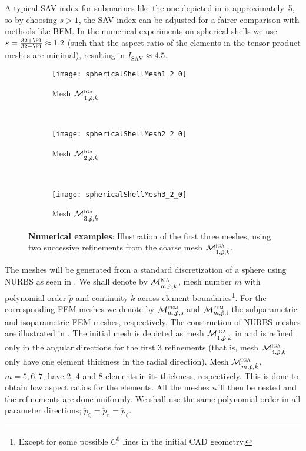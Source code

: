A typical SAV index for submarines like the one depicted in  is approximately~5, so by choosing $s>1$, the SAV index can be adjusted for a fairer comparison with methods like BEM. In the numerical experiments on spherical shells we use $s=\frac{32+\PI}{32-\PI}\approx 1.2$ (such that the aspect ratio of the elements in the tensor product meshes are minimal), resulting in $I_{\mathrm{SAV}}\approx 4.5$.
\begin{figure}
	\centering
	\begin{subfigure}{0.3\textwidth}
		\centering
		\texttt{[image: sphericalShellMesh1\_2\_0]}
		\caption{Mesh ${\cal M}_{1,\check{p},\check{k}}^{\textsc{iga}}$}
		\label{Fig2:SphericalShellMeshes1}
    \end{subfigure}
    ~
	\begin{subfigure}{0.3\textwidth}
		\centering
		\texttt{[image: sphericalShellMesh2\_2\_0]}
		\caption{Mesh ${\cal M}_{2,\check{p},\check{k}}^{\textsc{iga}}$}
		\label{Fig2:SphericalShellMeshes2}
    \end{subfigure}
    ~
	\begin{subfigure}{0.3\textwidth}
		\centering
		\texttt{[image: sphericalShellMesh3\_2\_0]}
		\caption{Mesh ${\cal M}_{3,\check{p},\check{k}}^{\textsc{iga}}$}
		\label{Fig2:SphericalShellMeshes3}
    \end{subfigure}
	\caption{\textbf{Numerical examples}: Illustration of the first three meshes, using two successive refinements from the coarse mesh ${\cal M}_{1,\check{p},\check{k}}^{\textsc{iga}}$.}
	\label{Fig2:SphericalShellMeshes}
\end{figure}

The meshes will be generated from a standard discretization of a sphere using NURBS as seen in . We shall denote by ${\cal M}_{m,\check{p},\check{k}}^{\textsc{iga}}$, mesh number $m$ with polynomial order $\check{p}$ and continuity $\check{k}$ across element boundaries\footnote{Except for some possible $C^0$ lines in the initial CAD geometry.}. For the corresponding FEM meshes we denote by ${\cal M}_{m,\check{p},\mathrm{s}}^{\textsc{fem}}$ and ${\cal M}_{m,\check{p},\mathrm{i}}^{\textsc{fem}}$ the subparametric and isoparametric FEM meshes, respectively. The construction of NURBS meshes are illustrated in . The initial mesh is depicted as mesh ${\cal M}_{1,\check{p},\check{k}}^{\textsc{iga}}$ in  and is refined only in the angular directions for the first 3 refinements (that is, mesh ${\cal M}_{4,\check{p},\check{k}}^{\textsc{iga}}$ only have one element thickness in the radial direction). Mesh ${\cal M}_{m,\check{p},\check{k}}^{\textsc{iga}}$, $m=5,6,7$, have 2, 4 and 8 elements in its thickness, respectively. This is done to obtain low aspect ratios for the elements. All the meshes will then be nested and the refinements are done uniformly. We shall use the same polynomial order in all parameter directions; $\check{p}_\upxi=\check{p}_\upeta=\check{p}_\upzeta$. 

